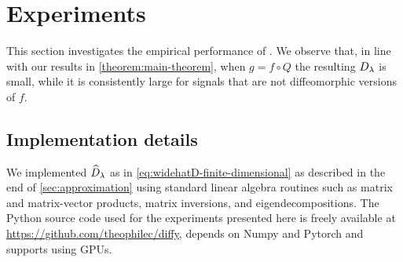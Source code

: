 








\section{Experiments}\label{sec:experiments}

This section investigates the empirical performance of \Diffy. We observe that, in line with our results in \cref{theorem:main-theorem}, when $g=f\circ Q$ the resulting $D_\lambda$ is small, while it is consistently large for signals that are not diffeomorphic versions of $f$.


\subsection{Implementation details}\label{sec:details}

We implemented $\widehat{D}_\lambda$ as in \cref{eq:widehatD-finite-dimensional} as described in the end of \cref{sec:approximation} using standard linear algebra routines such as matrix and matrix-vector products, matrix inversions, and eigendecompositions. The Python source code used for the experiments presented here is freely available at \href{https://github.com/theophilec/diffy}{https://github.com/theophilec/diffy}, depends on Numpy and Pytorch and supports using GPUs.

